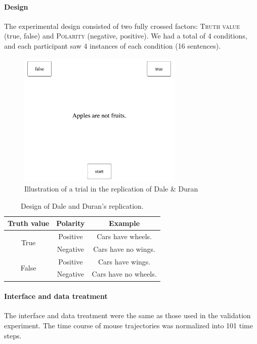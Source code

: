 \documentclass{article}
\begin{document}
\paragraph{Design}
The experimental design consisted of two fully crossed factors: \textsc{Truth value} (true, false) and \textsc{Polarity} (negative, positive). We had a total of 4 conditions, and each participant saw 4 instances of each condition (16 sentences). 


\begin{figure}
\centering
\includegraphics[width=0.7\textwidth]{trial_example2.png}
\caption{Illustration of a trial in the replication of Dale \& Duran}
\end{figure}



\begin{table}[h]
\centering
\begin{tabular}{ccc}
Truth value & Polarity & Example \\
\hline
\multirow{2}{*}{True} & Positive & Cars have wheels.\\ 
 & Negative & Cars have no wings.\\ 
\hline
\multirow{2}{*}{False} & Positive & Cars have wings.\\ 
 & Negative & Cars have no wheels.\\
\end{tabular}
\caption{Design of Dale and Duran's replication.} \label{table:exampleDD}
\end{table}


\paragraph{Interface and data treatment}
The interface and data treatment were the same as those used in the validation experiment. The time course of mouse trajectories was normalized into 101 time steps.
\end{document}
